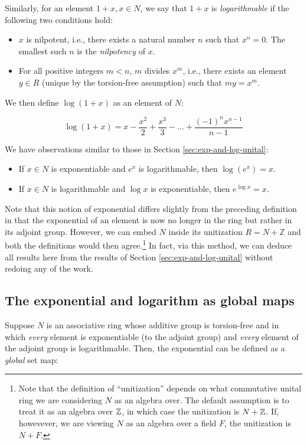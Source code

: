 Similarly, for an element $1 + x, x \in N$, we say that $1 + x$ is
{\em logarithmable} if the following two conditions hold:

\begin{itemize}
\item $x$ is nilpotent, i.e., there exists a natural number $n$ such
  that $x^n = 0$. The smallest such $n$ is the {\em nilpotency} of $x$.
\item For all positive integers $m < n$, $m$ divides $x^m$, i.e.,
  there exists an element $y \in R$ (unique by the torsion-free
  assumption) such that $my = x^m$.
\end{itemize}

We then define $\log(1 + x)$ as an element of $N$:

$$\log(1 + x) = x - \frac{x^2}{2} + \frac{x^3}{3} - \dots + \frac{(-1)^nx^{n-1}}{n - 1}$$

We have observations similar to those in Section \ref{sec:exp-and-log-unital}:

\begin{itemize}
\item If $x \in N$ is exponentiable and $e^x$ is logarithmable, then
  $\log(e^x) = x$.
\item If $x \in N$ is logarithmable and $\log x$ is exponentiable, then
  $e^{\log x} = x$.
\end{itemize}

Note that this notion of exponential differs slightly from the
preceding definition in that the exponential of an element is now no
longer in the ring but rather in its adjoint group. However, we can
embed $N$ inside its unitization $R = N + \mathbb{Z}$ and both the
definitions would then agree.\footnote{Note that the definition of
  ``unitization'' depends on what commutative unital ring we are
  considering $N$ as an algebra over. The default assumption is to
  treat it as an algebra over $\mathbb{Z}$, in which case the unitization is
  $N + \mathbb{Z}$. If, howevever, we are viewing $N$ as an algebra over a
  field $F$, the unitization is $N + F$.} In fact, via this method, we
  can deduce all results here from the results of Section
  \ref{sec:exp-and-log-unital} without redoing any of the work.

\subsection{The exponential and logarithm as global maps}\label{sec:exp-log-global}

Suppose $N$ is an associative ring whose additive group is
torsion-free and in which {\em every} element is exponentiable (to the
adjoint group) and {\em every} element of the adjoint group is
logarithmable. Then, the exponential can be defined as a {\em global}
set map:

